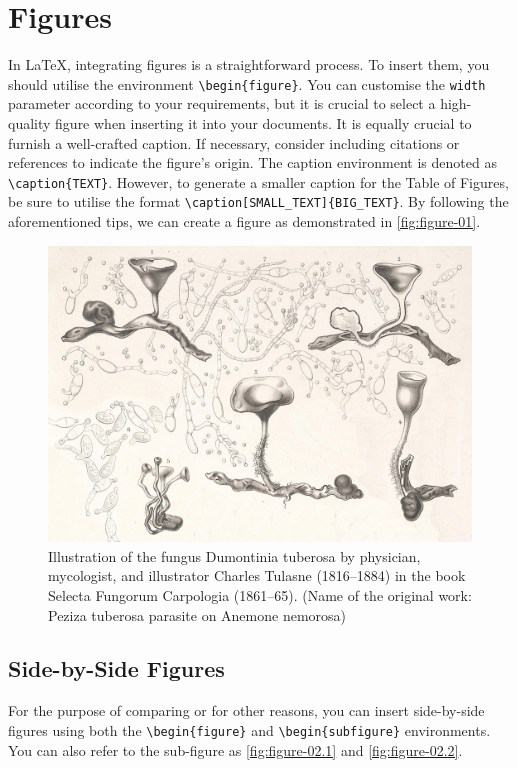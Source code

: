 \chapter{Figures}
In \LaTeX, integrating figures is a straightforward process. To insert them, you should utilise the environment \verb|\begin{figure}|. You can customise the \verb|width| parameter according to your requirements, but it is crucial to select a high-quality figure when inserting it into your documents. It is equally crucial to furnish a well-crafted caption. If necessary, consider including citations or references to indicate the figure's origin. The caption environment is denoted as \verb|\caption{TEXT}|. However, to generate a smaller caption for the Table of Figures, be sure to utilise the format \verb|\caption[SMALL_TEXT]{BIG_TEXT}|. By following the aforementioned tips, we can create a figure as demonstrated in \autoref{fig:figure-01}.

\begin{figure}[!htpb]
    \centering
    \includegraphics[width=\linewidth]{Figures/PezizaTuberosa.jpg}
    \caption[Illustration of the fungus Dumontinia tuberosa]{Illustration of the fungus Dumontinia tuberosa by physician, mycologist, and illustrator Charles Tulasne (1816–1884) in the book Selecta Fungorum Carpologia (1861–65). (Name of the original work: Peziza tuberosa parasite on Anemone nemorosa)}
    \label{fig:figure-01}
\end{figure}

\section{Side-by-Side Figures}
For the purpose of comparing or for other reasons, you can insert side-by-side figures using both the \verb|\begin{figure}| and \verb|\begin{subfigure}| environments. You can also refer to the sub-figure as \autoref{fig:figure-02.1} and \autoref{fig:figure-02.2}.

